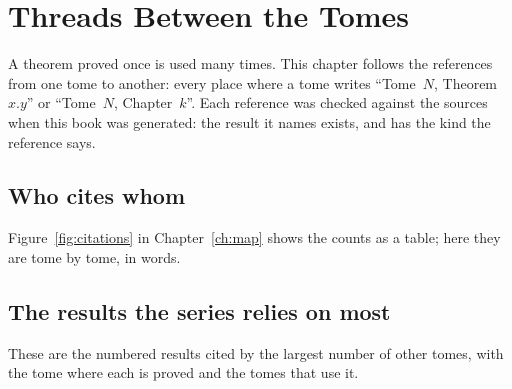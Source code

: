 \chapter{Threads Between the Tomes}\label{ch:threads}

A theorem proved once is used many times. This chapter follows the references from one tome to another: every place
where a tome writes ``Tome~$N$, Theorem~$x.y$'' or ``Tome~$N$, Chapter~$k$''. Each reference was checked against the
sources when this book was generated: the result it names exists, and has the kind the reference says.

\section{Who cites whom}

Figure~\ref{fig:citations} in Chapter~\ref{ch:map} shows the counts as a table; here they are tome by tome, in words.



\section{The results the series relies on most}

These are the numbered results cited by the largest number of other tomes, with the tome where each is proved and the
tomes that use it.


